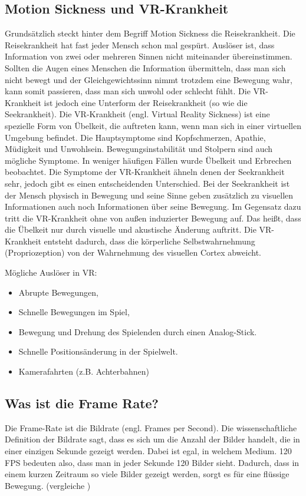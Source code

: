 \subsection{Motion Sickness und VR-Krankheit} \label{simon_motionsickness}
Grundsätzlich steckt hinter dem Begriff Motion Sickness die Reisekrankheit. Die Reisekrankheit hat fast jeder Mensch schon mal gespürt. Auslöser ist, dass Information von zwei oder mehreren Sinnen nicht miteinander übereinstimmen. Sollten die Augen eines Menschen die Information übermitteln, dass man sich nicht bewegt und der Gleichgewichtssinn nimmt trotzdem eine Bewegung wahr, kann somit passieren, dass man sich unwohl oder schlecht fühlt. Die VR-Krankheit ist jedoch eine Unterform der Reisekrankheit (so wie die Seekrankheit).
Die VR-Krankheit (engl. Virtual Reality Sickness) ist eine spezielle Form von Übelkeit, die auftreten kann, wenn man sich in einer virtuellen Umgebung befindet. Die Hauptsymptome sind Kopfschmerzen, Apathie, Müdigkeit und Unwohlsein. Bewegungsinstabilität und Stolpern sind auch mögliche Symptome. In weniger häufigen Fällen wurde Übelkeit und Erbrechen beobachtet. Die Symptome der VR-Krankheit ähneln denen der Seekrankheit sehr, jedoch gibt es einen entscheidenden Unterschied. Bei der Seekrankheit ist der Mensch physisch in Bewegung und seine Sinne geben zusätzlich zu visuellen Informationen auch noch Informationen über seine Bewegung. Im Gegensatz dazu tritt die VR-Krankheit ohne von außen induzierter Bewegung auf. Das heißt, dass die Übelkeit nur durch visuelle und akustische Änderung auftritt. Die VR-Krankheit entsteht dadurch, dass die körperliche Selbstwahrnehmung (Propriozeption) von der Wahrnehmung des visuellen Cortex abweicht.
\cite{_motionsickness}
\cite{_vr_quovadis}

\vspace{1cm}
Mögliche Auslöser in VR:
\begin{itemize}
	\item Abrupte Bewegungen,
	\item Schnelle Bewegungen im Spiel,
	\item Bewegung und Drehung des Spielenden durch einen Analog-Stick.
	\item Schnelle Positionsänderung in der Spielwelt.
	\item Kamerafahrten (z.B. Achterbahnen)
\end{itemize}


\subsection{Was ist die Frame Rate?}
Die Frame-Rate ist die Bildrate (engl. Frames per Second). Die wissenschaftliche Definition der Bildrate sagt, dass es sich um die Anzahl der Bilder handelt, die in einer einzigen Sekunde gezeigt werden. Dabei ist egal, in welchem Medium. 120 FPS bedeuten also, dass man in jeder Sekunde 120 Bilder sieht. Dadurch, dass in einem kurzen Zeitraum so viele Bilder gezeigt werden, sorgt es für eine flüssige Bewegung.
(vergleiche \cite{_vr_linde})


